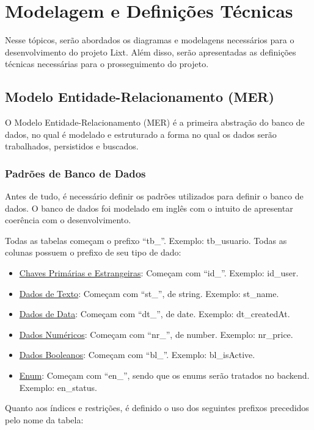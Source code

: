 \section{Modelagem e Definições Técnicas}

Nesse tópicos, serão abordados os diagramas e modelagens necessários para o desenvolvimento do projeto Lixt. Além disso, serão apresentadas as definições técnicas necessárias para o prosseguimento do projeto.

\subsection{Modelo Entidade-Relacionamento (MER)}

O Modelo Entidade-Relacionamento (MER) é a primeira abstração do banco de dados, no qual é modelado e estruturado a forma no qual os dados serão trabalhados, persistidos e buscados.

\subsubsection{Padrões de Banco de Dados}

Antes de tudo, é necessário definir os padrões utilizados para definir o banco de dados. O banco de dados foi modelado em inglês com o intuito de apresentar coerência com o desenvolvimento.

Todas as tabelas começam o prefixo ``tb\_''. Exemplo: tb\_usuario. Todas as colunas possuem o prefixo de seu tipo de dado:

\begin{itemize}
	\item \underline{Chaves Primárias e Estrangeiras}: Começam com ``id\_''. Exemplo: id\_user.
	\item \underline{Dados de Texto}: Começam com ``st\_'', de string. Exemplo: st\_name.
	\item \underline{Dados de Data}: Começam com ``dt\_'', de date. Exemplo: dt\_createdAt.
	\item \underline{Dados Numéricos}: Começam com ``nr\_'', de number. Exemplo: nr\_price.  
		\item \underline{Dados Booleanos}: Começam com ``bl\_''. Exemplo: bl\_isActive.  
	\item \underline{Enum}: Começam com ``en\_'', sendo que os enums serão tratados no backend. Exemplo: en\_status.  
\end{itemize}

Quanto aos índices e restrições, é definido o uso dos seguintes prefixos precedidos pelo nome da tabela:

